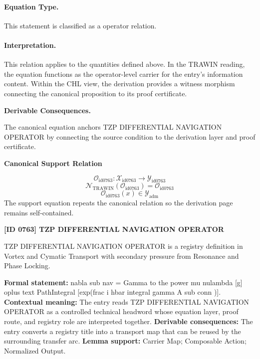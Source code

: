 \paragraph{Equation Type.}
This statement is classified as a operator relation.

\paragraph{Interpretation.}
This relation applies to the quantities defined above. In the TRAWIN reading, the equation functions as the operator-level carrier for the entry’s information content. Within the CHL view, the derivation provides a witness morphism connecting the canonical proposition to its proof certificate.

\par\vspace{0.35em}
\noindent\textbf{Derivable Consequences.}\quad
\begingroup
\footnotesize
\raggedright
The canonical equation anchors TZP DIFFERENTIAL NAVIGATION OPERATOR by connecting the source condition to the derivation layer and proof certificate.
\par\endgroup

\noindent\textbf{Canonical Support Relation}\par
\[
\mathcal{O}_{\mathrm{id0763}}:\mathcal{X}_{\mathrm{id0763}}\longrightarrow\mathcal{Y}_{\mathrm{id0763}}
\]
\[
\mathcal{N}_{\mathrm{TRAWIN}}(\mathcal{O}_{\mathrm{id0763}})=\mathcal{O}_{\mathrm{id0763}}
\]
\[
\mathcal{O}_{\mathrm{id0763}}(x)\in\mathcal{Y}_{\mathrm{adm}}
\]
\noindent The support equation repeats the canonical relation so the derivation page remains self-contained.\par

\clearpage
\noindent\textbf{[ID 0763] TZP DIFFERENTIAL NAVIGATION OPERATOR}\par
\vspace{0.35em}
\begingroup\small
{}
TZP DIFFERENTIAL NAVIGATION OPERATOR is a registry definition in Vortex and Cymatic Transport with secondary pressure from Resonance and Phase Locking.

\begingroup\footnotesize\setlength{\emergencystretch}{3em}\sloppy
\textbf{Formal statement:} nabla sub nav = Gamma to the power mu nulambda [g] oplus text PathIntegral [exp(frac i hbar integral gamma A sub conn )]. \textbf{Contextual meaning:} The entry reads TZP DIFFERENTIAL NAVIGATION OPERATOR as a controlled technical headword whose equation layer, proof route, and registry role are interpreted together. \textbf{Derivable consequences:} The entry converts a registry title into a transport map that can be reused by the surrounding transfer arc. \textbf{Lemma support:} Carrier Map; Composable Action; Normalized Output.\par
\endgroup

